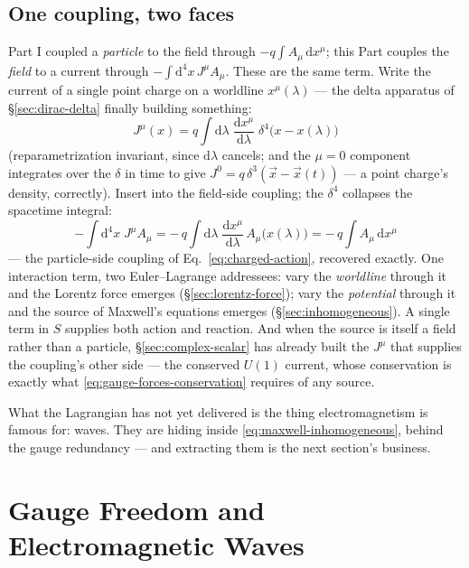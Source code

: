 \documentclass[11pt]{article}
\theoremstyle{plain}
\theoremstyle{definition}
\theoremstyle{remark}
\newcommand{\dd}{\mathrm{d}}
\newcommand{\tot}[2]{\frac{\dd #1}{\dd #2}}
\newcommand{\vx}{\vec{x}}
\begin{document}
\subsection{One coupling, two faces}
\label{sec:one-coupling}

Part I coupled a \emph{particle} to the field through
$-q\int A_\mu\,\dd x^\mu$; this Part couples the \emph{field} to a
current through $-\int\dd^4x\, J^\mu A_\mu$. These are the same term.
Write the current of a single point charge on a worldline
$x^\mu(\lambda)$ --- the delta apparatus of \S\ref{sec:dirac-delta}
finally building something:
\begin{equation}
  J^\mu(x)
  = q \int \dd\lambda\;
    \tot{x^\mu}{\lambda}\;
    \delta^4\bigl(x - x(\lambda)\bigr)
  \label{eq:point-current}
\end{equation}
(reparametrization invariant, since $\dd\lambda$ cancels; and the
$\mu = 0$ component integrates over the $\delta$ in time to give
$J^0 = q\,\delta^3(\vx - \vx(t))$ --- a point charge's density,
correctly). Insert into the field-side coupling; the
$\delta^4$ collapses the spacetime integral:
\begin{equation}
  -\int \dd^4x\; J^\mu A_\mu
  = -\,q \int \dd\lambda\; \tot{x^\mu}{\lambda}\,
    A_\mu\bigl(x(\lambda)\bigr)
  = -\,q \int A_\mu\, \dd x^\mu
\end{equation}
--- the particle-side coupling of Eq.~\eqref{eq:charged-action},
recovered exactly. One interaction term, two Euler--Lagrange
addressees: vary the \emph{worldline} through it and the Lorentz
force emerges (\S\ref{sec:lorentz-force}); vary the \emph{potential}
through it and the source of Maxwell's equations emerges
(\S\ref{sec:inhomogeneous}). A single term in $S$ supplies both
action and reaction. And when the source is itself a field rather
than a particle, \S\ref{sec:complex-scalar} has already built the
$J^\mu$ that supplies the coupling's other side --- the conserved
$U(1)$ current, whose conservation is exactly what
\eqref{eq:gauge-forces-conservation} requires of any source.

\medskip
\noindent
What the Lagrangian has not yet delivered is the thing
electromagnetism is famous for: waves. They are hiding inside
\eqref{eq:maxwell-inhomogeneous}, behind the gauge redundancy --- and
extracting them is the next section's business.

\section{Gauge Freedom and Electromagnetic Waves}
\label{sec:gauge}
\end{document}

